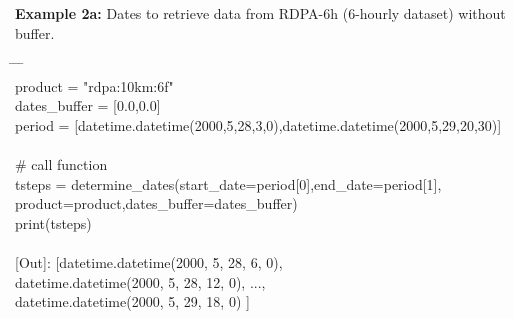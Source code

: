 \documentclass[10pt,a4paper,titlepage,parskip]{scrartcl}
\newenvironment{ttfont}{\fontfamily{\ttdefault}\selectfont}{\par}
\newcommand{\GRAU}[1]{\textcolor{ufzgray2}{#1}}
\begin{document}
\textbf{Example 2a:} Dates to retrieve data from RDPA-6h (6-hourly dataset) without buffer.
\begin{framed}
	\vspace*{-1.2cm}
	\begin{ttfont}
		\begin{tabbing}
			\hspace{1.5cm} \= \hspace{2.7cm} \= \hspace{4.7cm} \= \kill \\[4pt]
			product = "rdpa:10km:6f"\\
			dates\_buffer = [0.0,0.0]\\
			period = [datetime.datetime(2000,5,28,3,0),datetime.datetime(2000,5,29,20,30)]\\
			\\
			\GRAU{\# call function}\\
			tsteps = determine\_dates(start\_date=period[0],end\_date=period[1],\\
			\> \> product=product,dates\_buffer=dates\_buffer)\\
			print(tsteps)\\
			\\
			\GRAU{[Out]: [datetime.datetime(2000, 5, 28, 6, 0),}\\
			\> 	\GRAU{ datetime.datetime(2000, 5, 28, 12, 0), ..., }\\
			\> 	\GRAU{ datetime.datetime(2000, 5, 29, 18, 0) ]   }\\
		\end{tabbing}
	\end{ttfont}
	\vspace*{-0.3cm}
\end{framed}
\vspace*{-0.3cm}

%
%
\end{document}

